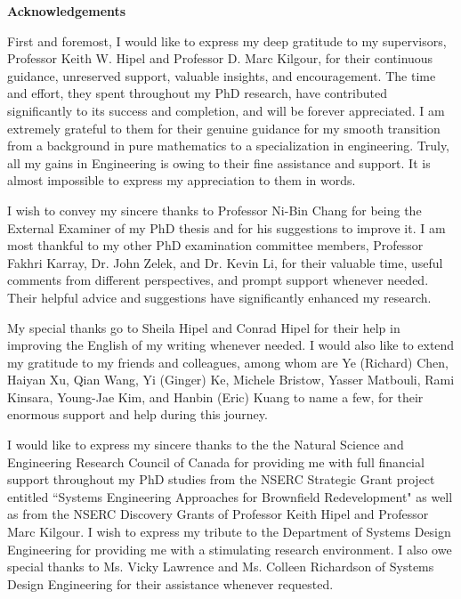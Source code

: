 \cleardoublepage




\begin{center}
  \textbf{\LARGE{Acknowledgements}}
\end{center}

First and foremost, I would like to express my deep gratitude to my supervisors, Professor Keith W. Hipel and Professor D. Marc Kilgour, for their continuous guidance, unreserved support, valuable insights, and encouragement. The time and effort, they spent throughout my PhD research, have contributed significantly to its success and completion, and will be forever appreciated. I am extremely grateful to them for their genuine guidance for my smooth transition from a background in pure mathematics to a specialization in engineering. Truly, all my gains in Engineering is owing to their fine assistance and support. It is almost impossible to express my appreciation to them in words.

I wish to convey my sincere thanks to Professor Ni-Bin Chang for being the External Examiner of my PhD thesis and for his suggestions to improve it. I am most thankful to my other PhD examination committee members, Professor Fakhri Karray, Dr. John Zelek, and Dr. Kevin Li, for their valuable time, useful comments from different perspectives, and prompt support whenever needed. Their helpful advice and suggestions have significantly enhanced my research.

My special thanks go to Sheila Hipel and Conrad Hipel for their help in improving the English of my writing whenever needed. I would also like to extend my gratitude to my friends and colleagues, among whom are Ye (Richard) Chen, Haiyan Xu, Qian Wang, Yi (Ginger) Ke, Michele Bristow, Yasser Matbouli, Rami Kinsara, Young-Jae Kim, and Hanbin (Eric) Kuang to name a few, for their enormous support and help during this journey.

I would like to express my sincere thanks to the the Natural Science and Engineering Research Council of Canada for providing me with full financial support throughout my PhD studies from the NSERC Strategic Grant project entitled ``Systems Engineering Approaches for Brownfield Redevelopment" as well as from the NSERC Discovery Grants of Professor Keith Hipel and Professor Marc Kilgour. I wish to express my tribute to the Department of Systems Design Engineering for providing me with a stimulating research environment. I also owe special thanks to Ms. Vicky Lawrence and Ms. Colleen Richardson of Systems Design Engineering for their assistance whenever requested.

